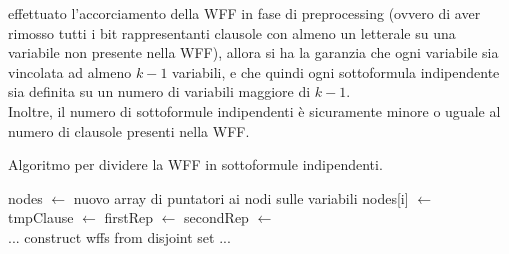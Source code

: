 effettuato l'accorciamento della WFF in fase di preprocessing (ovvero di aver rimosso 
tutti i bit rappresentanti clausole con almeno un letterale su una variabile non presente nella WFF), 
allora si ha la garanzia che ogni variabile sia vincolata ad almeno $k-1$ variabili, e che 
quindi ogni sottoformula indipendente sia definita su un numero di variabili maggiore di 
$k-1$.\\
Inoltre, il numero di sottoformule indipendenti è sicuramente minore o uguale al numero di clausole presenti nella WFF.
\begin{algorithm}
    \caption{Algoritmo per dividere la WFF in sottoformule indipendenti.}
    \label{alg:split_indipendent_wff}
    \begin{algorithmic}[1]
        \State nodes $\gets$ nuovo array di puntatori ai nodi sulle variabili
            \State nodes[i] $\gets$ 
        \EndFor\\

        \State tmpClause $\gets$ 
                \State firstRep $\gets$ 
                \State secondRep $\gets$ 
                    \State {}
                \EndIf
            \EndFor
            \State {}
        \EndFor\\

        \State ... construct wffs from disjoint set ...
        \EndProcedure
    \end{algorithmic}
\end{algorithm}

